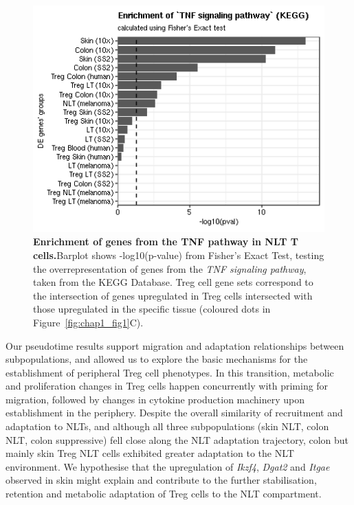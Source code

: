 \begin{figure}[h!]
\centering    
\includegraphics[]{Chapter2/Figs/TNF_treg.png} %
\caption[Enrichment of genes from the TNF pathway in NLT T cells]{\textbf{Enrichment of genes from the TNF pathway in NLT T cells.}\newline Barplot shows -log10(p-value) from Fisher's Exact Test, testing the overrepresentation of genes from the \textit{TNF signaling pathway}, taken from the KEGG Database. Treg cell gene sets correspond to the intersection of genes upregulated in Treg cells intersected with those upregulated in the specific tissue (coloured dots in Figure~\ref{fig:chap1_fig1}C).}
\label{fig:chap2_tnf}
\end{figure}

Our pseudotime results support migration and adaptation relationships between subpopulations, and allowed us to explore the basic mechanisms for the establishment of peripheral Treg cell phenotypes. In this transition, metabolic and proliferation changes in Treg cells happen concurrently with priming for migration, followed by changes in cytokine production machinery upon establishment in the periphery. Despite the overall similarity of recruitment and adaptation to NLTs, and although all three subpopulations (skin NLT, colon NLT, colon suppressive) fell close along the NLT adaptation trajectory, colon but mainly skin Treg NLT cells exhibited greater adaptation to the NLT environment. We hypothesise that the upregulation of \textit{Ikzf4}, \textit{Dgat2} and \textit{Itgae} observed in skin might explain and contribute to the further stabilisation, retention and metabolic adaptation of Treg cells to the NLT compartment.

